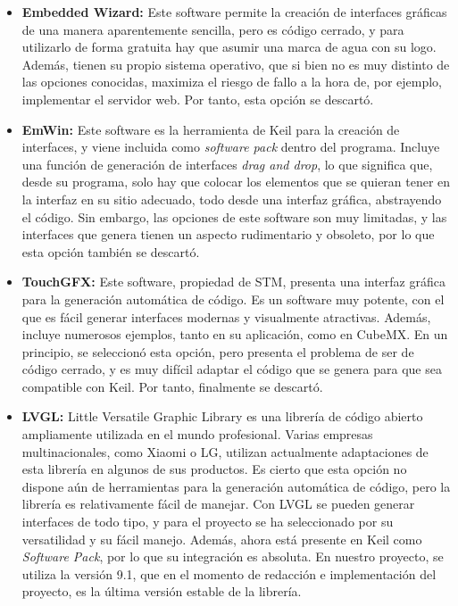 \begin{itemize}
  \item \textbf{Embedded Wizard:} Este software permite la creación de interfaces gráficas de una manera aparentemente sencilla, pero es código cerrado, y para utilizarlo de forma gratuita hay que asumir una marca de agua con su logo. Además, tienen su propio sistema operativo, que si bien no es muy distinto de las opciones conocidas, maximiza el riesgo de fallo a la hora de, por ejemplo, implementar el servidor web. Por tanto, esta opción se descartó.
  \item \textbf{EmWin:} Este software es la herramienta de Keil para la creación de interfaces, y viene incluida como \textit{software pack} dentro del programa. Incluye una función de generación de interfaces \textit{drag and drop}, lo que significa que, desde su programa, solo hay que colocar los elementos que se quieran tener en la interfaz en su sitio adecuado, todo desde una interfaz gráfica, abstrayendo el código. Sin embargo, las opciones de este software son muy limitadas, y las interfaces que genera tienen un aspecto rudimentario y obsoleto, por lo que esta opción también se descartó.
  \item \textbf{TouchGFX:} Este software, propiedad de STM, presenta una interfaz gráfica para la generación automática de código. Es un software muy potente, con el que es fácil generar interfaces modernas y visualmente atractivas. Además, incluye numerosos ejemplos, tanto en su aplicación, como en CubeMX. En un principio, se seleccionó esta opción, pero presenta el problema de ser de código cerrado, y es muy difícil adaptar el código que se genera para que sea compatible con Keil. Por tanto, finalmente se descartó.
  \item \textbf{LVGL:} Little Versatile Graphic Library es una librería de código abierto ampliamente utilizada en el mundo profesional. Varias empresas multinacionales, como Xiaomi o LG, utilizan actualmente adaptaciones de esta librería en algunos de sus productos. Es cierto que esta opción no dispone aún de herramientas para la generación automática de código, pero la librería es relativamente fácil de manejar. Con LVGL se pueden generar interfaces de todo tipo, y para el proyecto se ha seleccionado por su versatilidad y su fácil manejo. Además, ahora está presente en Keil como \textit{Software Pack}, por lo que su integración es absoluta. En nuestro proyecto, se utiliza la versión 9.1, que en el momento de redacción e implementación del proyecto, es la última versión estable de la librería.
\end{itemize}
